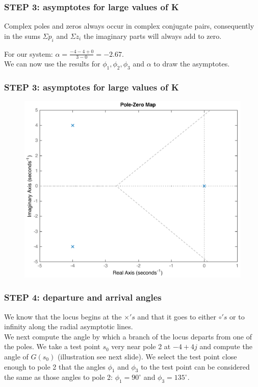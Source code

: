 \begin{frame}
\frametitle{STEP 3: asymptotes for large values of K}
	Complex poles and zeros always occur in complex conjugate pairs, consequently in the sums $\Sigma p_i$ and $\Sigma z_i$ the imaginary parts will always add to zero.\\
	\vspace{1em}
	\begin{exampleblock}{}
	For our system: $\alpha = \frac{-4-4+0}{3-0} = -2.67.$\\
	\vspace{1em}
	We can now use the results for $\phi_1, \phi_2, \phi_3$ and $\alpha$ to draw the asymptotes. 
	\end{exampleblock}
\end{frame}

\begin{frame}
\frametitle{STEP 3: asymptotes for large values of K}
	\begin{exampleblock}{}
		\begin{figure}
			\centering
			\includegraphics[width=0.7\linewidth]{how_to_draw_ex3}
		\end{figure}
	\end{exampleblock}
\end{frame}

\begin{frame}
\frametitle{STEP 4: departure and arrival angles}
	We know that the locus begins at the $\times's$ and that it goes to either $\circ's$ or to infinity along the radial asymptotic lines.\\
	\vspace{1em}
	We next compute the angle by which a branch of the locus departs from one of the poles. We take a test point $s_0$ very near pole 2 at $-4+4j$ and compute the angle of $G(s_0)$ (illustration see next slide). We select the test point close enough to pole 2 that the angles $\phi_1$ and $\phi_3$ to the test point can be considered the same as those angles to pole 2: $\phi_1 = 90^{\circ}$ and $\phi_3 = 135^{\circ}$. 
\end{frame}

